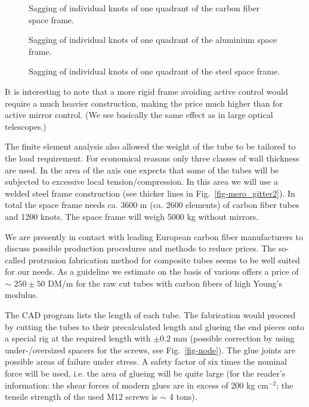 \begin{figure}[htb]
\leavevmode
\centering
\epsfxsize=13cm
\caption{Sagging of individual knots of one quadrant
of the carbon fiber space frame.}
\label{fig-sagging1}
\end{figure}

\begin{figure}[htb]
\leavevmode
\centering
\epsfxsize=13cm
\caption{Sagging of individual knots of one quadrant
of the aluminium space frame.}
\label{fig-sagging2}
\end{figure}

\begin{figure}[htb]
\leavevmode
\centering
\epsfxsize=13cm
\caption{Sagging of individual knots of one quadrant
of the steel space frame.}
\label{fig-sagging3}
\end{figure}

It is interesting to note that a more rigid frame avoiding active control
would require a much heavier construction, making the price much higher than
for active mirror control. (We see basically the same effect as in large
optical telescopes.)

The finite element analysis also allowed the weight of the tube to be
tailored to the load requirement. For economical reasons only three classes
of wall thickness are used. In the area of the axis one expects that some of
the tubes will be subjected to excessive local tension/compression. In this
area we will use a welded steel frame construction (see thicker lines in
Fig.~\ref{fig-mero_gitter2}). In total the space frame needs ca. 3600 m (ca. 2600 elements)
of carbon fiber tubes and 1200 knots. The space frame will weigh 5000 kg
without mirrors.

We are presently in contact with leading European carbon fiber manufacturers
to discuss possible production procedures and methods to reduce prices. The
so-called protrusion fabrication method for composite tubes seems to be well
suited for our needs. As a guideline we estimate on the basis of various
offers a price of $\sim$ $250 \pm 50$ DM/m for the raw cut tubes with carbon
fibers of high Young's modulus.

The CAD program lists the length of each tube. The fabrication would proceed
by cutting the tubes to their precalculated length and glueing the end pieces
onto a special rig at the required length with $\pm 0.2$ mm (possible
correction by using under-/oversized spacers for the screws, see Fig.~\ref{fig-node}).
The glue joints are possible areas of failure under stress. A
safety factor of six times the nominal force will be used, i.e. the area of
glueing will be quite large (for the reader's information: the shear forces
of modern glues are in excess of 200 kg cm$^{-2}$; the tensile strength of
the used M12 screws is $\sim$ 4 tons).

